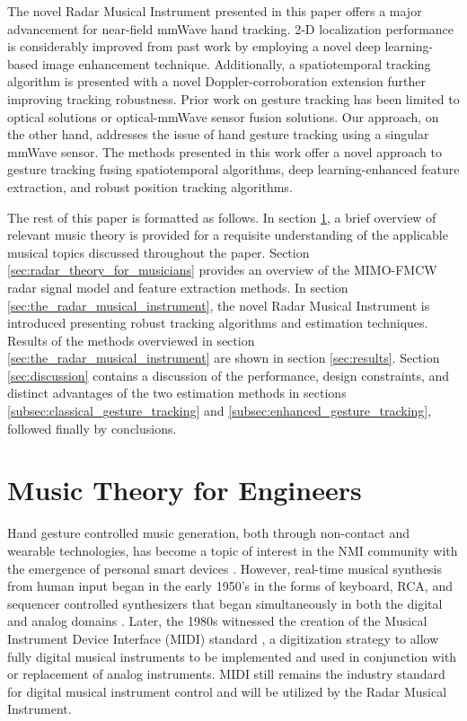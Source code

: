 \documentclass[10pt,journal,final]{IEEEtran}
\begin{document}
The novel Radar Musical Instrument presented in this paper offers a major advancement for near-field mmWave hand tracking. 2-D localization performance is considerably improved from past work \cite{mmWave_tracking:WiDeo} by employing a novel deep learning-based image enhancement technique. Additionally, a spatiotemporal tracking algorithm is presented with a novel Doppler-corroboration extension further improving tracking robustness. Prior work on gesture tracking has been limited to optical solutions \cite{optical_tracking:kinect,optical_tracking:zaman} or optical-mmWave \cite{mmWave_tracking:ThuMouse} sensor fusion solutions. Our approach, on the other hand,  addresses the issue of hand gesture tracking using a singular mmWave sensor. The methods presented in this work offer a novel approach to gesture tracking fusing spatiotemporal algorithms, deep learning-enhanced feature extraction, and robust position tracking algorithms.

The rest of this paper is formatted as follows. In section \ref{sec:music_theory_for_engineers}, a brief overview of relevant music theory is provided for a requisite understanding of the applicable musical topics discussed throughout the paper. Section \ref{sec:radar_theory_for_musicians} provides an overview of the MIMO-FMCW radar signal model and feature extraction methods. In section \ref{sec:the_radar_musical_instrument}, the novel Radar Musical Instrument is introduced presenting robust tracking algorithms and estimation techniques. Results of the methods overviewed in section \ref{sec:the_radar_musical_instrument} are shown in section \ref{sec:results}. Section \ref{sec:discussion} contains a discussion of the performance, design constraints, and distinct advantages of the two estimation methods in sections \ref{subsec:classical_gesture_tracking} and \ref{subsec:enhanced_gesture_tracking}, followed finally by conclusions.

\section{Music Theory for Engineers}
\label{sec:music_theory_for_engineers}
Hand gesture controlled music generation, both through non-contact \cite{intro:RGBcamera,intro:kinect} and wearable technologies, has become a topic of interest in the NMI community with the emergence of personal smart devices \cite{music:NMIs}. However, real-time musical synthesis from human input began in the early 1950's in the forms of keyboard, RCA, and sequencer controlled synthesizers that began simultaneously in both the digital and analog domains \cite{music:evolution_of_real_time_music_synthesizers}. Later, the 1980s witnessed the creation of the Musical Instrument Device Interface (MIDI) standard \cite{music:history_of_MIDI}, a digitization strategy to allow fully digital musical instruments to be implemented and used in conjunction with or replacement of analog instruments. MIDI still remains the industry standard for digital musical instrument control and will be utilized by the Radar Musical Instrument.
\end{document}
